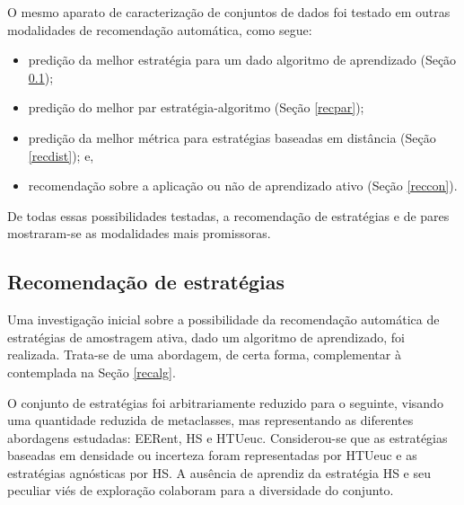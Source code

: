 O mesmo aparato de caracterização de conjuntos de dados foi testado em outras modalidades de recomendação automática, como segue:
\begin{itemize}
   \item predição da melhor estratégia para um dado algoritmo de aprendizado (Seção \ref{recest});
   \item predição do melhor par estratégia-algoritmo (Seção \ref{recpar});
   \item predição da melhor métrica para estratégias baseadas em distância (Seção \ref{recdist}); e,
   \item recomendação sobre a aplicação ou não de aprendizado ativo (Seção \ref{reccon}).
\end{itemize}
De todas essas possibilidades testadas, a recomendação de estratégias e de pares mostraram-se as modalidades mais promissoras.

\subsection{Recomendação de estratégias}\label{recest}
Uma investigação inicial sobre a possibilidade da recomendação automática de estratégias de amostragem ativa, dado um algoritmo de aprendizado, foi realizada.
Trata-se de uma abordagem, de certa forma, complementar à contemplada na Seção \ref{recalg}.

O conjunto de estratégias foi arbitrariamente reduzido para o seguinte, visando uma quantidade reduzida de metaclasses, mas representando as diferentes abordagens estudadas: EERent, HS e HTUeuc.
Considerou-se que as estratégias baseadas em densidade ou incerteza foram representadas por HTUeuc e as estratégias agnósticas por HS.
A ausência de aprendiz da estratégia HS e seu peculiar viés de exploração colaboram para a diversidade do conjunto.


